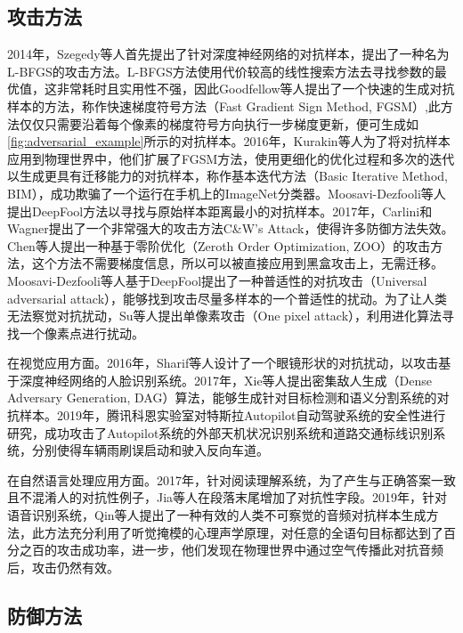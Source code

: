 \subsection{攻击方法}

2014年，Szegedy等人首先提出了针对深度神经网络的对抗样本，提出了一种名为L-BFGS的攻击方法。L-BFGS方法使用代价较高的线性搜索方法去寻找参数的最优值，这非常耗时且实用性不强，因此Goodfellow等人提出了一个快速的生成对抗样本的方法，称作快速梯度符号方法（Fast Gradient Sign Method, FGSM）,此方法仅仅只需要沿着每个像素的梯度符号方向执行一步梯度更新，便可生成如\autoref{fig:adversarial_example}所示的对抗样本\cite{goodfellow2014explaining}。2016年，Kurakin等人为了将对抗样本应用到物理世界中，他们扩展了FGSM方法，使用更细化的优化过程和多次的迭代以生成更具有迁移能力的对抗样本，称作基本迭代方法（Basic Iterative Method, BIM），成功欺骗了一个运行在手机上的ImageNet分类器\cite{kurakin2016adversarial}。Moosavi-Dezfooli等人提出DeepFool方法以寻找与原始样本距离最小的对抗样本\cite{moosavi2016deepfool}。2017年，Carlini和Wagner提出了一个非常强大的攻击方法C\&W's Attack，使得许多防御方法失效\cite{carlini2017towards}。Chen等人提出一种基于零阶优化（Zeroth Order Optimization, ZOO）的攻击方法，这个方法不需要梯度信息，所以可以被直接应用到黑盒攻击上，无需迁移\cite{chen2017zoo}。Moosavi-Dezfooli等人基于DeepFool提出了一种普适性的对抗攻击（Universal adversarial attack），能够找到攻击尽量多样本的一个普适性的扰动。为了让人类无法察觉对抗扰动，Su等人提出单像素攻击（One pixel attack），利用进化算法寻找一个像素点进行扰动\cite{su2019one}。

在视觉应用方面。2016年，Sharif等人设计了一个眼镜形状的对抗扰动，以攻击基于深度神经网络的人脸识别系统\cite{sharif2016accessorize}。2017年，Xie等人提出密集敌人生成（Dense Adversary Generation, DAG）算法，能够生成针对目标检测和语义分割系统的对抗样本\cite{xie2017adversarial}。2019年，腾讯科恩实验室对特斯拉Autopilot自动驾驶系统的安全性进行研究，成功攻击了Autopilot系统的外部天机状况识别系统和道路交通标线识别系统，分别使得车辆雨刷误启动和驶入反向车道\cite{tecent2019tesla}。

在自然语言处理应用方面。2017年，针对阅读理解系统，为了产生与正确答案一致且不混淆人的对抗性例子，Jia等人在段落末尾增加了对抗性字段\cite{jia2017adversarial}。2019年，针对语音识别系统，Qin等人提出了一种有效的人类不可察觉的音频对抗样本生成方法，此方法充分利用了听觉掩模的心理声学原理，对任意的全语句目标都达到了百分之百的攻击成功率，进一步，他们发现在物理世界中通过空气传播此对抗音频后，攻击仍然有效\cite{qin2019imperceptible}。

\subsection{防御方法}

